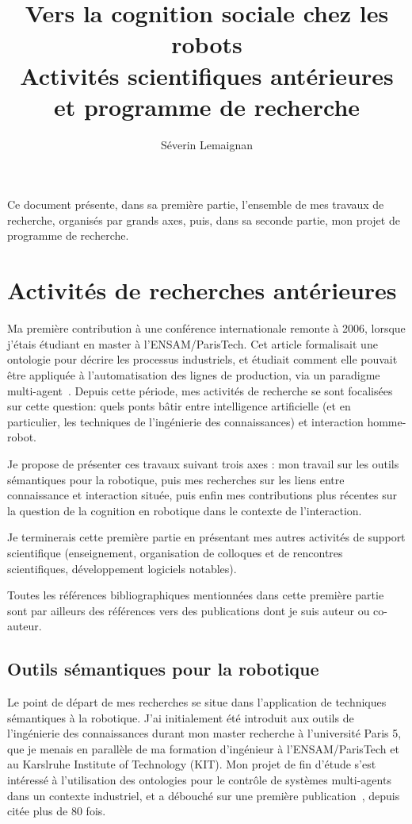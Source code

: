 \documentclass[a4paper]{article}
\title{Vers la cognition sociale chez les robots \\ 
    {\large Activités scientifiques antérieures et programme de recherche}}
\author{Séverin Lemaignan}
\date{}
\begin{document}
\maketitle

Ce document présente, dans sa première partie, l'ensemble de mes travaux de
recherche, organisés par grands axes, puis, dans sa seconde partie, mon projet
de programme de recherche.

\section{Activités de recherches antérieures}
\newrefsection

Ma première contribution à une conférence internationale remonte à 2006, lorsque
j'étais étudiant en master à l'ENSAM/ParisTech. Cet article formalisait une
ontologie pour décrire les processus industriels, et étudiait comment elle
pouvait être appliquée à l'automatisation des lignes de production, via un
paradigme multi-agent~\cite{lemaignan2006mason}. Depuis cette période, mes
activités de recherche se sont focalisées sur cette question: quels ponts bâtir
entre intelligence artificielle (et en particulier, les techniques de
l'ingénierie des connaissances) et interaction homme-robot.

Je propose de présenter ces travaux suivant trois axes : mon travail sur les
outils sémantiques pour la robotique, puis mes recherches sur les liens entre
connaissance et interaction située, puis enfin mes contributions plus récentes
sur la question de la cognition en robotique dans le contexte de l'interaction.

Je terminerais cette première partie en présentant mes autres activités de
support scientifique (enseignement, organisation de colloques et de rencontres
scientifiques, développement logiciels notables).

Toutes les références bibliographiques mentionnées dans cette première partie
sont par ailleurs des références vers des publications dont je suis auteur ou
co-auteur.

\subsection{Outils sémantiques pour la robotique%
  \label{semantic-tools-for-robotics}%
}

Le point de départ de mes recherches se situe dans l'application de techniques
sémantiques à la robotique. J'ai initialement été introduit aux outils de
l'ingénierie des connaissances durant mon master recherche à l'université Paris
5, que je menais en parallèle de ma formation d'ingénieur à l'ENSAM/ParisTech et
au Karslruhe Institute of Technology (KIT). Mon projet de fin d'étude s'est
intéressé à l'utilisation des ontologies pour le contrôle de systèmes
multi-agents dans un contexte industriel, et a débouché sur une première
publication~\cite{lemaignan2006mason}, depuis citée plus de 80 fois.
\end{document}

